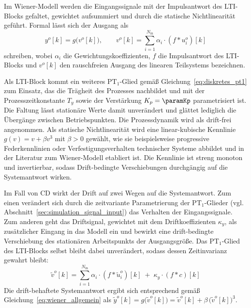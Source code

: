 %
Im Wiener-Modell werden die Eingangssignale mit der Impulsantwort des \ac{LTI}-Blocks gefaltet, gewichtet aufsummiert und durch die statische Nichtlinearität geführt. Formal lässt sich der Ausgang als 
%
\begin{equation}
    y^o[k] = g\bigl(v^o[k]\bigr), \qquad v^o[k] = \sum_{i=1}^{N_{\mathrm{in}}} \alpha_i \cdot (f \ast u_i^o)[k]
    \label{eq:wiener_allgemein}
\end{equation}
%
schreiben, wobei $\alpha_i$ die Gewichtungskoeffizienten, $f$ die Impulsantwort des \ac{LTI}-Blocks und $v^o[k]$ den rauschfreien Ausgang des linearen Teilsystems bezeichnen. \par
Als \ac{LTI}-Block kommt ein weiteres $\mathrm{PT}_1$-Glied gemäß Gleichung~\eqref{eq:diskretes_pt1} zum Einsatz, das die Trägheit des Prozesses nachbildet und mit der Prozesszeitkonstante $T_y$ sowie der Verstärkung $K_p = \paramKp$ parametrisiert ist. Die Faltung lässt stationäre Werte damit unverändert und glättet lediglich die Übergänge zwischen Betriebspunkten. Die Prozessdynamik wird als drift-frei angenommen. Als statische Nichtlinearität wird eine linear-kubische Kennlinie $g(v) = v + \beta v^3$ mit $\beta > 0$ gewählt, wie sie beispielsweise progressive Federkennlinien oder Verfestigungsverhalten technischer Systeme abbildet und in der Literatur zum Wiener-Modell etabliert ist. Die Kennlinie ist streng monoton und invertierbar, sodass Drift-bedingte Verschiebungen durchgängig auf die Systemantwort wirken.
\par
Im Fall von \ac{CD} wirkt der Drift auf zwei Wegen auf die Systemantwort. Zum einen verändert sich durch die zeitvariante Parametrierung der $\mathrm{PT}_1$-Glieder
(vgl. Abschnitt~\ref{sec:simulation_signal_input}) das Verhalten der Eingangssignale. Zum anderen geht das Driftsignal, gewichtet mit dem Driftkoeffizienten $\kappa_y$, als zusätzlicher Eingang in das Modell ein und bewirkt eine drift-bedingte Verschiebung des stationären Arbeitspunkts der Ausgangsgröße. Das $\mathrm{PT}_1$-Glied des \ac{LTI}-Blocks selbst bleibt dabei unverändert, sodass dessen Zeitinvarianz gewahrt bleibt:
%
\begin{equation}
    \tilde{v}^o[k] = \sum_{i=1}^{N_{\mathrm{in}}} \alpha_i \cdot (f \ast \tilde{u}_i^o)[k] \;+\; \kappa_y \cdot (f \ast c)[k]
    \label{eq:linkombi_cd}
\end{equation}
%
Die drift-behaftete Systemantwort ergibt sich entsprechend gemäß Gleichung~\eqref{eq:wiener_allgemein} als $\tilde{y}^o[k] = g\bigl(\tilde{v}^o[k]\bigr) = \tilde{v}^o[k] + \beta\,\bigl(\tilde{v}^o[k]\bigr)^3$. \par
